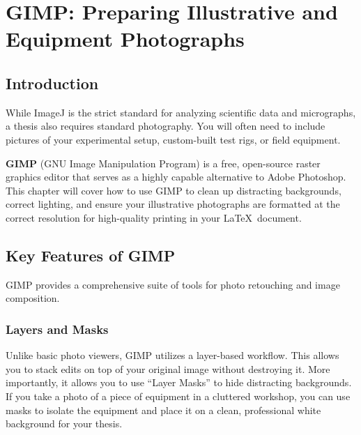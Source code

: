 \chapter{GIMP: Preparing Illustrative and Equipment Photographs}\label{ch:gimp}
	\section{Introduction}\label{sec:GIMPIntroduction}
		While ImageJ is the strict standard for analyzing scientific data and micrographs, a thesis also requires standard photography. 
		You will often need to include pictures of your experimental setup, custom-built test rigs, or field equipment. 

		\textbf{GIMP} (GNU Image Manipulation Program) is a free, open-source raster graphics editor that serves as a highly capable alternative to Adobe Photoshop. 
		This chapter will cover how to use GIMP to clean up distracting backgrounds, correct lighting, and ensure your illustrative photographs are formatted at the correct resolution for high-quality printing in your \LaTeX\ document.


	\section{Key Features of GIMP}
		GIMP provides a comprehensive suite of tools for photo retouching and image composition.

		\subsection{Layers and Masks}
			Unlike basic photo viewers, GIMP utilizes a layer-based workflow. 
			This allows you to stack edits on top of your original image without destroying it. 
			More importantly, it allows you to use \enquote{Layer Masks} to hide distracting backgrounds. 
			If you take a photo of a piece of equipment in a cluttered workshop, you can use masks to isolate the equipment and place it on a clean, professional white background for your thesis.

